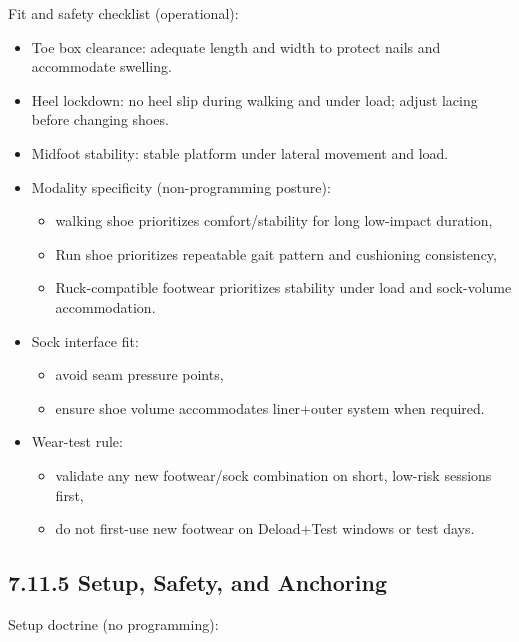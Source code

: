 \documentclass[10pt]{article}
\begin{document}
Fit and safety checklist (operational):

\begin{itemize}
\item Toe box clearance: adequate length and width to protect nails and accommodate swelling.
\item Heel lockdown: no heel slip during walking and under load; adjust lacing before changing shoes.
\item Midfoot stability: stable platform under lateral movement and load.
\item Modality specificity (non-programming posture):
  \begin{itemize}
  \item walking shoe prioritizes comfort/stability for long low-impact duration,
  \item Run shoe prioritizes repeatable gait pattern and cushioning consistency,
  \item Ruck-compatible footwear prioritizes stability under load and sock-volume accommodation.
  \end{itemize}
\item Sock interface fit:
  \begin{itemize}
  \item avoid seam pressure points,
  \item ensure shoe volume accommodates liner+outer system when required.
  \end{itemize}
\item Wear-test rule:
  \begin{itemize}
  \item validate any new footwear/sock combination on short, low-risk sessions first,
  \item do not first-use new footwear on Deload+Test windows or test days.
  \end{itemize}
\end{itemize}

\subsection*{7.11.5 Setup, Safety, and Anchoring}
{}

Setup doctrine (no programming):
\end{document}
